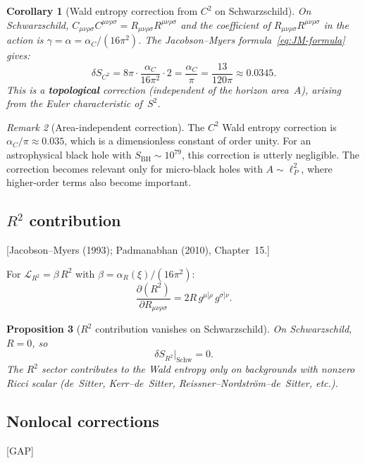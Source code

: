\documentclass[12pt,a4paper]{article}
\newtheorem{proposition}{Proposition}[section]
\newtheorem{corollary}[proposition]{Corollary}
\theoremstyle{definition}
\theoremstyle{remark}
\newtheorem{remark}[proposition]{Remark}
\newcommand{\Rsq}{R_{\mu\nu\rho\sigma}R^{\mu\nu\rho\sigma}}
\newcommand{\Weylsq}{C_{\mu\nu\rho\sigma}C^{\mu\nu\rho\sigma}}
\newcommand{\fromlit}[1]{\textcolor{blue!70!black}{\textsf{[#1]}}}
\newcommand{\gap}{\textcolor{red!80!black}{\textsf{[GAP]}}}
\begin{document}
\begin{corollary}[Wald entropy correction from $C^2$ on Schwarzschild]
\label{cor:delta-S-C2}
On Schwarzschild, $\Weylsq = \Rsq$ and the coefficient of
$\Rsq$ in the action is $\gamma = \alpha = \alpha_C/(16\pi^2)$.
The Jacobson--Myers formula~\eqref{eq:JM-formula} gives:
\begin{equation}\label{eq:delta-S-C2}
  \boxed{
  \delta S_{C^2} = 8\pi \cdot \frac{\alpha_C}{16\pi^2} \cdot 2
  = \frac{\alpha_C}{\pi}
  = \frac{13}{120\pi}
  \approx 0.0345.}
\end{equation}
This is a \textbf{topological} correction (independent of the horizon
area~$A$), arising from the Euler characteristic of~$S^2$.
\end{corollary}

\begin{remark}[Area-independent correction]
The $C^2$ Wald entropy correction is $\alpha_C/\pi \approx 0.035$,
which is a dimensionless constant of order unity.  For an astrophysical
black hole with $S_{\mathrm{BH}} \sim 10^{79}$, this correction is
utterly negligible.  The correction becomes relevant only for
micro-black holes with $A \sim \ell_P^2$, where higher-order terms
also become important.
\end{remark}

\subsection{$R^2$ contribution}
\fromlit{Jacobson--Myers (1993); Padmanabhan (2010), Chapter~15.}

For $\mathcal{L}_{R^2} = \beta\,R^2$ with
$\beta = \alpha_R(\xi)/(16\pi^2)$:
\begin{equation}
  \frac{\partial(R^2)}{\partial R_{\mu\nu\rho\sigma}}
  = 2R\,g^{\mu[\rho}\,g^{\sigma]\nu}.
\end{equation}

\begin{proposition}[$R^2$ contribution vanishes on Schwarzschild]
\label{prop:R2-vanishes}
On Schwarzschild, $R = 0$, so
\begin{equation}
  \delta S_{R^2}\big|_{\mathrm{Schw}} = 0.
\end{equation}
The $R^2$ sector contributes to the Wald entropy only on backgrounds
with nonzero Ricci scalar (de~Sitter, Kerr--de~Sitter,
Reissner--Nordstr\"om--de~Sitter, etc.).
\end{proposition}

\subsection{Nonlocal corrections}
\label{sec:nonlocal-wald}
\gap
\end{document}

